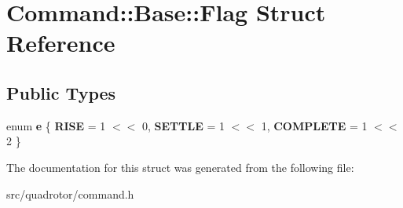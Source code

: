 \hypertarget{structCommand_1_1Base_1_1Flag}{\section{\-Command\-:\-:\-Base\-:\-:\-Flag \-Struct \-Reference}
\label{structCommand_1_1Base_1_1Flag}
}
\subsection*{\-Public \-Types}
\begin{DoxyCompactItemize}
\item 
enum {\bfseries e} \{ {\bfseries \-R\-I\-S\-E} =  1 $<$$<$ 0, 
{\bfseries \-S\-E\-T\-T\-L\-E} =  1 $<$$<$ 1, 
{\bfseries \-C\-O\-M\-P\-L\-E\-T\-E} =  1 $<$$<$ 2
 \}
\end{DoxyCompactItemize}


\-The documentation for this struct was generated from the following file\-:\begin{DoxyCompactItemize}
\item 
src/quadrotor/command.\-h\end{DoxyCompactItemize}
